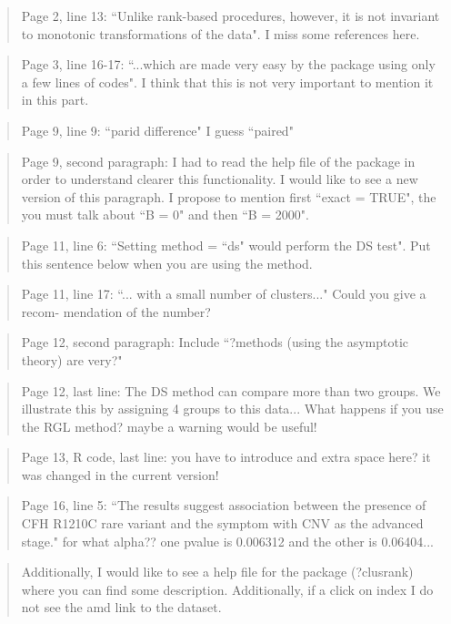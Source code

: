 \documentclass[12pt]{article}
\newenvironment{comment}%
{\begin{quotation}\noindent\small\it\ignorespaces%
  }{\end{quotation}}
\begin{document}
\begin{comment}
Page 2, line 13: ``Unlike rank-based procedures, however, it is not
invariant to monotonic transformations of the data". I miss some
references here.
\end{comment}

\begin{comment}
Page 3, line 16-17: ``...which are made very easy by the package using only a few
lines of codes". I think that this is not very important to mention it in this part.
\end{comment}

\begin{comment}
Page 9, line 9: ``parid difference" I guess ``paired"
\end{comment}

\begin{comment}
Page 9, second paragraph: I had to read the help file of the package in
order to understand clearer this functionality. 
I would like to see a new version of this paragraph.
I propose to mention first ``exact = TRUE", the you must talk about ``B = 0" and
then ``B = 2000".
\end{comment}

\begin{comment}
Page 11, line 6: ``Setting method = ``ds" would perform the DS test". Put this
sentence below when you are using the method.
\end{comment}

\begin{comment}
Page 11, line 17: ``... with a small number of clusters..." Could you give a recom-
mendation of the number?
\end{comment}

\begin{comment}
Page 12, second paragraph: Include ``?methods (using the asymptotic theory) are
very?"
\end{comment}

\begin{comment}
Page 12, last line: The DS method can compare more than two groups. We illustrate
this by assigning 4 groups to this data... What happens if you use the RGL method?
maybe a warning would be useful!
\end{comment}

\begin{comment}
Page 13, R code, last line: you have to introduce and extra space here? it was
changed in the current version!
\end{comment}

\begin{comment}
Page 16, line 5: ``The results suggest association between the presence of CFH
R1210C rare variant and the symptom with CNV as the advanced stage." for what
alpha?? one pvalue is 0.006312 and the other is 0.06404...
\end{comment}

\begin{comment}
Additionally, I would like to see a help file for the package (?clusrank)
where you can find some description. 
Additionally, if a click on index I do not see the amd link to the dataset.
\end{comment}



\end{document}

